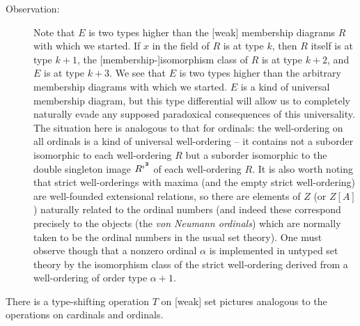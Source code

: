 \documentclass[12pt]{book}
\begin{document}
\begin{description}
\item[Observation:] Note that $E$ is two types higher than the [weak]
membership diagrams $R$ with which we started.  If $x$ in the field of
$R$ is at type $k$, then $R$ itself is at type $k+1$, the
[membership-]isomorphism class of $R$ is at type $k+2$, and $E$ is at
type $k+3$.  We see that $E$ is two types higher than the arbitrary
membership diagrams with which we started.  $E$ is a kind of universal
membership diagram, but this type differential will allow us to
completely naturally evade any supposed paradoxical consequences of
this universality.  The situation here is analogous to that for
ordinals: the well-ordering on all ordinals is a kind of universal
well-ordering -- it contains not a suborder isomorphic to each
well-ordering $R$ but a suborder isomorphic to the double singleton
image $R^{\iota^{\bf 2}}$ of each well-ordering $R$.  It is also worth
noting that strict well-orderings with maxima (and the empty strict
well-ordering) are well-founded extensional relations, so there are
elements of $Z$ (or $Z[A]$) naturally related to the ordinal numbers
(and indeed these correspond precisely to the objects (the {\em von
Neumann ordinals\/}) which are normally taken to be the ordinal
numbers in the usual set theory).  One must observe though that a
nonzero ordinal $\alpha$ is implemented in untyped set theory by the
isomorphism class of the strict well-ordering derived from a
well-ordering of order type $\alpha+1$.

\end{description}

There is a type-shifting operation $T$ on [weak] set pictures analogous to
the operations on cardinals and ordinals.
\end{document}
